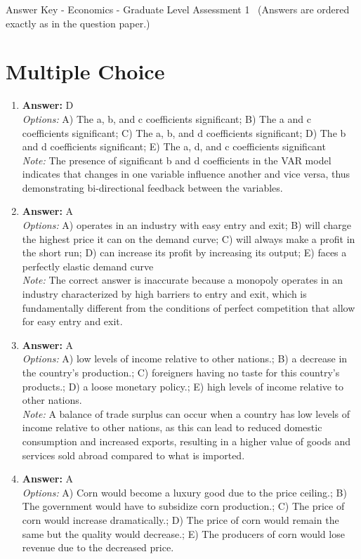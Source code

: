 \documentclass[12pt]{article}
\begin{document}
\begin{center}
Answer Key - Economics - Graduate Level Assessment 1 \
\small (Answers are ordered exactly as in the question paper.)
\end{center}

\section*{Multiple Choice}
\begin{enumerate}[label=\arabic*.]
\item \textbf{Answer:} D
\\ \textit{Options:} A) The a, b, and c coefficients significant; B) The a and c coefficients significant; C) The a, b, and d coefficients significant; D) The b and d coefficients significant; E) The a, d, and c coefficients significant
\\ \textit{Note:} The presence of significant b and d coefficients in the VAR model indicates that changes in one variable influence another and vice versa, thus demonstrating bi-directional feedback between the variables.
\item \textbf{Answer:} A
\\ \textit{Options:} A) operates in an industry with easy entry and exit; B) will charge the highest price it can on the demand curve; C) will always make a profit in the short run; D) can increase its profit by increasing its output; E) faces a perfectly elastic demand curve
\\ \textit{Note:} The correct answer is inaccurate because a monopoly operates in an industry characterized by high barriers to entry and exit, which is fundamentally different from the conditions of perfect competition that allow for easy entry and exit.
\item \textbf{Answer:} A
\\ \textit{Options:} A) low levels of income relative to other nations.; B) a decrease in the country's production.; C) foreigners having no taste for this country's products.; D) a loose monetary policy.; E) high levels of income relative to other nations.
\\ \textit{Note:} A balance of trade surplus can occur when a country has low levels of income relative to other nations, as this can lead to reduced domestic consumption and increased exports, resulting in a higher value of goods and services sold abroad compared to what is imported.
\item \textbf{Answer:} A
\\ \textit{Options:} A) Corn would become a luxury good due to the price ceiling.; B) The government would have to subsidize corn production.; C) The price of corn would increase dramatically.; D) The price of corn would remain the same but the quality would decrease.; E) The producers of corn would lose revenue due to the decreased price.

\end{enumerate}
\end{document}

